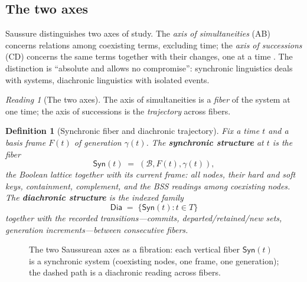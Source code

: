\documentclass[11pt,a4paper]{article}
\newtheorem{definition}[principle]{Definition}
\theoremstyle{remark}
\newtheorem{reading}[principle]{Reading}
\newcommand{\Lat}{\ensuremath{\mathcal{B}}}              %
\newcommand{\Sync}{\ensuremath{\mathsf{Syn}}}            %
\newcommand{\Dia}{\ensuremath{\mathsf{Dia}}}             %
\newcommand{\Gen}{\ensuremath{\gamma}}                   %
\begin{document}
\subsection{The two axes}
\label{sec:axes}

Saussure distinguishes two axes of study. The \emph{axis of simultaneities}
(AB) concerns relations among coexisting terms, excluding time; the \emph{axis
of successions} (CD) concerns the same terms together with their changes, one
at a time \cite[Part I, ch.~III, \S1]{harris1983}. The distinction is
``absolute and allows no compromise'': synchronic linguistics deals with
systems, diachronic linguistics with isolated events.

\begin{reading}[The two axes]
\label{read:axes}
The axis of simultaneities is a \emph{fiber} of the system at one time; the
axis of successions is the \emph{trajectory} across fibers.
\end{reading}

\begin{definition}[Synchronic fiber and diachronic trajectory]
\label{def:syn-dia}
Fix a time $t$ and a basis frame $F(t)$ of generation $\Gen(t)$. The
\textbf{synchronic structure} at $t$ is the fiber
\[
  \Sync(t) \;=\; (\Lat, F(t), \Gen(t)),
\]
the Boolean lattice together with its current frame: all nodes, their hard and
soft keys, containment, complement, and the BSS readings among coexisting
nodes. The \textbf{diachronic structure} is the indexed family
\[
  \Dia \;=\; \{\Sync(t) : t \in T\}
\]
together with the recorded transitions---commits, departed/retained/new
sets, generation increments---between consecutive fibers.
\end{definition}

\begin{figure}[htbp]
\centering
{}
\caption{The two Saussurean axes as a fibration: each vertical fiber
$\Sync(t)$ is a synchronic system (coexisting nodes, one frame, one
generation); the dashed path is a diachronic reading across fibers.}
\label{fig:axes}
\end{figure}
\end{document}
